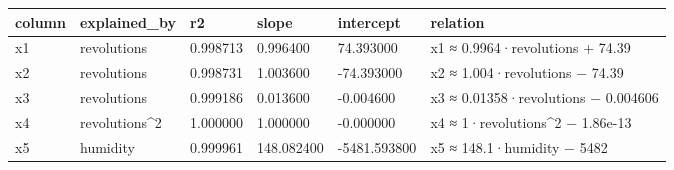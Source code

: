 \begin{tabular}{llllll}
\toprule
column & explained\_by & r2 & slope & intercept & relation \\
\midrule
x1 & revolutions & 0.998713 & 0.996400 & 74.393000 & x1 ≈ 0.9964·revolutions + 74.39 \\
x2 & revolutions & 0.998731 & 1.003600 & -74.393000 & x2 ≈ 1.004·revolutions − 74.39 \\
x3 & revolutions & 0.999186 & 0.013600 & -0.004600 & x3 ≈ 0.01358·revolutions − 0.004606 \\
x4 & revolutions\^{}2 & 1.000000 & 1.000000 & -0.000000 & x4 ≈ 1·revolutions\^{}2 − 1.86e-13 \\
x5 & humidity & 0.999961 & 148.082400 & -5481.593800 & x5 ≈ 148.1·humidity − 5482 \\
\bottomrule
\end{tabular}
